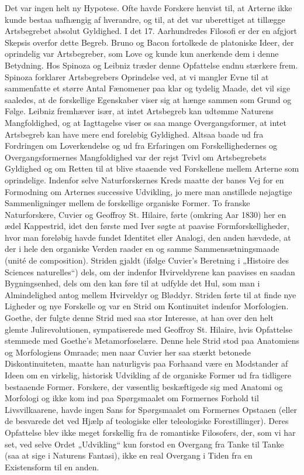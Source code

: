 \documentclass[12pt,a4paper,openany]{book}
\newcommand{\opage}[1]{\marginnote{\footnotesize\textit{[#1]}}}
\begin{document}
Det var ingen helt ny Hypotese. Ofte havde Forskere henvist til,
at Arterne ikke kunde bestaa uafhængig af hverandre, og til, at det
var uberettiget at tillægge Artsbegrebet absolut Gyldighed. I det 17.
Aarhundredes Filosofi er der en afgjort Skepsis overfor dette Begreb.
Bruno og Bacon fortolkede de platoniske Ideer, der oprindelig
var Artsbegreber, som Love og kunde kun anerkende dem i denne
Betydning. Hos Spinoza og Leibniz træder denne Opfattelse endnu
stærkere frem. Spinoza forklarer Artsbegrebers Oprindelse ved, at
vi mangler Evne til at sammenfatte et større Antal Fænomener paa
klar og tydelig Maade, det vil sige saaledes, at de forskellige Egenskaber
viser sig at hænge sammen som Grund og Følge. Leibniz
fremhæver især, at intet Artsbegreb kan udtømme Naturens Mangfoldighed,
og at Iagttagelse viser os saa mange Overgangsformer, at
intet Artsbegreb kan have mere end foreløbig Gyldighed. Altsaa
baade ud fra Fordringen om Loverkendelse og ud fra Erfaringen om
Forskellighedernes og Overgangsformernes Mangfoldighed var der
rejst Tvivl om Artsbegrebets Gyldighed og om Retten til at blive
\opage{36}staaende ved Forskellene mellem Arterne som oprindelige. Indenfor
selve Naturforskernes Kreds maatte der banes Vej for en Formodning
om Arternes successive Udvikling, jo mere man anstillede nøjagtige
Sammenligninger mellem de forskellige organiske Former. To
franske Naturforskere, Cuvier og Geoffroy St. Hilaire, førte (omkring
Aar 1830) her en ædel Kappestrid, idet den første med Iver
søgte at paavise Formforskelligheder, hvor man foreløbig havde fundet
Identitet eller Analogi, den anden hævdede, at der i hele den organiske
Verden raader en og samme Sammensætningsmaade (unité
de composition). Striden gjaldt (ifølge Cuvier’s Beretning i „Histoire
des Sciences naturelles“) dels, om der indenfor Hvirveldyrene kan
paavises en saadan Bygningsenhed, dels om den kan føre til at udfylde
det Hul, som man i Almindelighed antog mellem Hvirveldyr
og Bløddyr. Striden førte til at finde nye Ligheder og nye Forskelle
og var en Strid om Kontinuitet indenfor Morfologien. Goethe, der
fulgte denne Strid med saa stor Interesse, at han over den helt
glemte Julirevolutionen, sympatiserede med Geoffroy St. Hilaire, hvis
Opfattelse stemmede med Goethe’s Metamorfoselære. Denne hele
Strid stod paa Anatomiens og Morfologiens Omraade; men naar
Cuvier her saa stærkt betonede Diskontinuiteten, maatte han naturligvis
paa Forhaand være en Modstander af Ideen om en virkelig,
historisk Udvikling af de organiske Former ud fra tidligere bestaaende
Former. Forskere, der væsentlig beskæftigede sig med Anatomi
og Morfologi og ikke kom ind paa Spørgsmaalet om Formernes Forhold
til Livsvilkaarene, havde ingen Sans for Spørgsmaalet om Formernes
Opstaaen (eller de besvarede det ved Hjælp af teologiske
eller teleologiske Forestillinger). Deres Opfattelse blev ikke meget
forskellig fra de romantiske Filosofers, der, som vi har set, ved selve
Ordet „Udvikling“ kun forstod en Overgang fra Tanke til Tanke
(saa at sige i Naturens Fantasi), ikke en real Overgang i Tiden fra
en Existensform til en anden.
\end{document}
